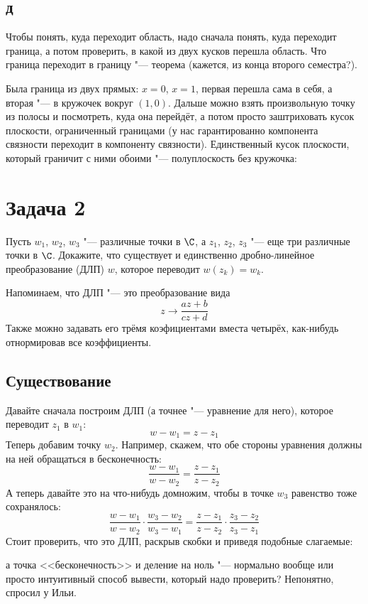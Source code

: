 	\subsection{д}
		Чтобы понять, куда переходит область, надо сначала понять, куда переходит граница,
		а потом проверить, в какой из двух кусков перешла область.
		Что граница переходит в границу "--- теорема (кажется, из конца второго семестра?).

		Была граница из двух прямых: $x=0$, $x=1$, первая перешла сама в себя, а вторая "--- в
		кружочек вокруг $(1, 0)$.
		Дальше можно взять произвольную точку из полосы и посмотреть, куда она перейдёт,
		а потом просто заштриховать кусок плоскости, ограниченный границами (у нас гарантированно
		компонента связности переходит в компоненту связности).
		Единственный кусок плоскости, который граничит с ними обоими "--- полуплоскость
		без кружочка:

\section{Задача 2}
	Пусть $w_1$, $w_2$, $w_3$ "--- различные точки в $\C$,
	а $z_1$, $z_2$, $z_3$ "--- еще три различные точки в $\C$.
	Докажите, что существует и единственно дробно-линейное преобразование (ДЛП) $w$,
	которое переводит $w(z_k)=w_k$.
	\begin{Rem}
		Напоминаем, что ДЛП "--- это преобразование вида
		\[ z \to \frac{az+b}{cz+d} \]
		Также можно задавать его трёмя коэфициентами вместа четырёх, как-нибудь отнормировав все коэффициенты.
	\end{Rem}

	\subsection{Существование}
		Давайте сначала построим ДЛП (а точнее "--- уравнение для него), которое переводит $z_1$ в $w_1$:
		\[ w - w_1 = z - z_1 \]
		Теперь добавим точку $w_2$.
		Например, скажем, что обе стороны уравнения должны на ней обращаться в бесконечность:
		\[
			\frac{w-w_1}{w-w_2} = \frac{z-z_1}{z-z_2}
		\]
		А теперь давайте это на что-нибудь домножим, чтобы в точке $w_3$ равенство тоже сохранялось:
		\begin{equation}\label{mobius_three_points}
			\frac{w-w_1}{w-w_2} \cdot \frac{w_3-w_2}{w_3-w_1} = \frac{z-z_1}{z-z_2} \cdot \frac{z_3-z_2}{z_3-z_1}
		\end{equation}
		Стоит проверить, что это ДЛП, раскрыв скобки и приведя подобные слагаемые:
		\TODO
		\begin{Rem}
			\TODO а точка <<бесконечность>> и деление на ноль "--- нормально вообще или просто интуитивный способ вывести, который надо проверить?
			Непонятно, спросил у Ильи.
		\end{Rem}

